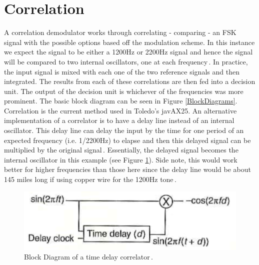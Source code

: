 \section{Correlation}
A correlation demodulator works through correlating - comparing - an FSK signal with the possible options based off the modulation scheme. In this instance we expect the signal to be either a 1200Hz or 2200Hz signal and hence the signal will be compared to two internal oscillators, one at each frequency\,\cite{Rowe2014}. In practice, the input signal is mixed with each one of the two reference signals and then integrated. The results from each of these correlations are then fed into a decision unit. The output of the decision unit is whichever of the frequencies was more prominent. The basic block diagram can be seen in Figure \ref{BlockDiagrams}. Correlation is the current method used in Toledo's javAX25. An alternative implementation of a correlator is to have a delay line instead of an internal oscillator. This delay line can delay the input by the time for one period of an expected frequency (i.e. 1/2200Hz) to elapse and then this delayed signal can be multiplied by the original signal\,\cite{Seguine2006}. Essentially, the delayed signal becomes the internal oscillator in this example (see Figure \ref{TimeDelayCorrelator}). Side note, this would work better for higher frequencies than those here since the delay line would be about 145 miles long if using copper wire for the 1200Hz tone\,\cite{HowFastIsElectricity}. 

\begin{figure}
  \centering
	\includegraphics[width=0.75\linewidth]{images/TimeDelayCorrelator.png} 
	\caption{Block Diagram of a time delay correlator\,\cite{Seguine2006}.}
   \label{TimeDelayCorrelator}
\end{figure}

